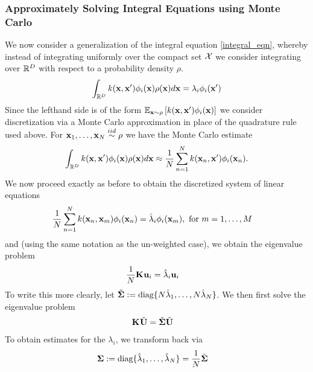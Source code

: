 \documentclass[12pt]{article}
\begin{document}
\subsubsection{Approximately Solving Integral Equations using Monte Carlo}
We now consider a generalization of the integral equation \ref{integral_eqn}, whereby instead of integrating uniformly over the compact set $\mathcal{X}$ we consider 
integrating over $\mathbb{R}^{D}$ with respect to a probability density $\rho$. 
\begin{align}
\int_{\mathbb{R}^{D}} k(\mathbf{x}, \mathbf{x}^\prime) \phi_i(\mathbf{x}) \rho(\mathbf{x}) d\mathbf{x} = \lambda_i \phi_i(\mathbf{x}^\prime) \label{integral_eqn_weighted}
\end{align}
Since the lefthand side is of the form $\mathbb{E}_{\mathbf{x} \sim \rho}\left[k(\mathbf{x}, \mathbf{x}^\prime) \phi_i(\mathbf{x}) \right]$ we consider discretization via a Monte Carlo approximation in place of the 
quadrature rule used above. For $\mathbf{x}_1, \dots, \mathbf{x}_{N} \overset{iid}{\sim} \rho$ we have the Monte Carlo estimate
\begin{align}
\int_{\mathbb{R}^{D}} k(\mathbf{x}, \mathbf{x}^\prime) \phi_i(\mathbf{x}) \rho(\mathbf{x}) d\mathbf{x} \approx \frac{1}{N} \sum_{n = 1}^{N} k(\mathbf{x}_{n}, \mathbf{x}^\prime) \phi_i(\mathbf{x}_{n}).
\end{align} 
We now proceed exactly as before to obtain the discretized system of linear equations
\begin{align}
\frac{1}{N} \sum_{n = 1}^{N} k(\mathbf{x}_{n}, \mathbf{x}_m) \phi_i(\mathbf{x}_{n}) &= \hat{\lambda}_i \phi_i(\mathbf{x}_{m}), \text{ for } m = 1, \dots, M
\end{align}
and (using the same notation as the un-weighted case), we obtain the eigenvalue problem 
\begin{align}
\frac{1}{N} \mathbf{K}_{} \mathbf{u}_i &= \hat{\lambda}_i \mathbf{u}_i
\end{align}
To write this more clearly, let $\tilde{\boldsymbol{\Sigma}} := \text{diag}\{N \hat{\lambda}_1, \dots, N \hat{\lambda}_{N}\}$. We then first solve the eigenvalue problem 
\begin{align}
\mathbf{K}_{} \tilde{\mathbf{U}} &= \tilde{\boldsymbol{\Sigma}} \tilde{\mathbf{U}}
\end{align}
To obtain estimates for the $\lambda_i$, we transform back via 
\begin{align}
\boldsymbol{\Sigma} &:= \text{diag}\{\hat{\lambda}_1, \dots, \hat{\lambda}_{N}\} = \frac{1}{N} \tilde{\boldsymbol{\Sigma}} 
\end{align}
\end{document}
